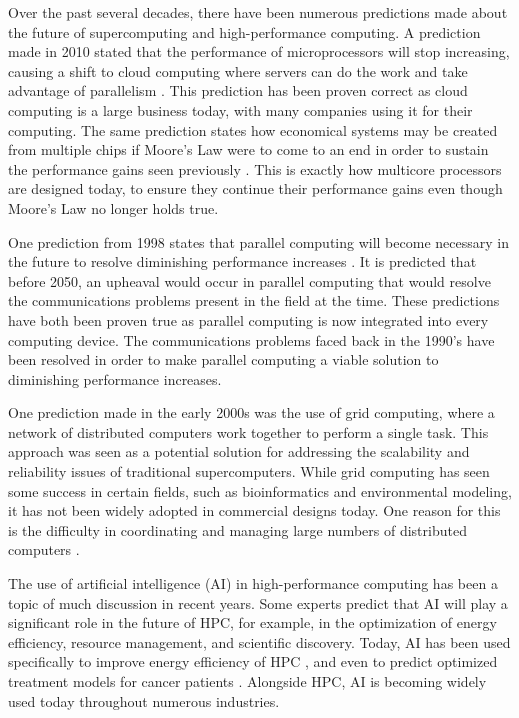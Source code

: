 \documentclass[twocolumn,12pt, singlespace]{IEEEtran}
\begin{document}
Over the past several decades, there have been numerous predictions made about the future of supercomputing and high-performance computing. A prediction made in 2010 stated that the performance of microprocessors will stop increasing, causing a shift to cloud computing where servers can do the work and take advantage of parallelism \cite{Patterson:2010}. This prediction has been proven correct as cloud computing is a large business today, with many companies using it for their computing. The same prediction states how economical systems may be created from multiple chips if Moore's Law were to come to an end in order to sustain the performance gains seen previously \cite{Patterson:2010}. This is exactly how multicore processors are designed today, to ensure they continue their performance gains even though Moore's Law no longer holds true.

One prediction from 1998 states that parallel computing will become necessary in the future to resolve diminishing performance increases \cite{Trefethen:1998}. It is predicted that before 2050, an upheaval would occur in parallel computing that would resolve the communications problems present in the field at the time. These predictions have both been proven true as parallel computing is now integrated into every computing device. The communications problems faced back in the 1990's have been resolved in order to make parallel computing a viable solution to diminishing performance increases. 

	One prediction made in the early 2000s was the use of grid computing, where a network of distributed computers work together to perform a single task. This approach was seen as a potential solution for addressing the scalability and reliability issues of traditional supercomputers. While grid computing has seen some success in certain fields, such as bioinformatics and environmental modeling, it has not been widely adopted in commercial designs today. One reason for this is the difficulty in coordinating and managing large numbers of distributed computers \cite{Dabroski:2009}.

The use of artificial intelligence (AI) in high-performance computing has been a topic of much discussion in recent years. Some experts predict that AI will play a significant role in the future of HPC, for example, in the optimization of energy efficiency, resource management, and scientific discovery. Today, AI has been used specifically to improve energy efficiency of HPC \cite{Kelechi:2020}, and even to predict optimized treatment models for cancer patients \cite{Bhattacharya:2019}. Alongside HPC, AI is becoming widely used today throughout numerous industries.
\end{document}
